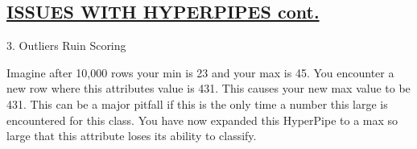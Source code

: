 \begin{kasten}
    \section*{ \hspace{0.1cm} {\color{red} \underline{ISSUES WITH HYPERPIPES cont.}}}
    \large{

3. Outliers Ruin Scoring

\vspace{3 mm}
Imagine after 10,000 rows your min is 23 
and your max is 45. You encounter a new row where this attributes value is 
431. This causes your new max value to be 431. This can be a major pitfall 
if this is the only time a number this large is encountered for this class. 
 You have now expanded this HyperPipe to a max so large that this attribute 
loses its ability to classify.

    }
\end{kasten}

